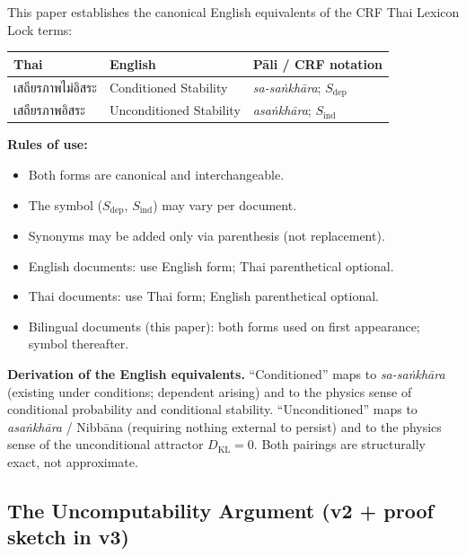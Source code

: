 \documentclass[12pt, a4paper]{article}
\begin{document}
This paper establishes the canonical English equivalents of the
CRF Thai Lexicon Lock terms:

\begin{formalbox}[title={Lexicon Lock --- Canonical Bilingual Form (v3)}]
\begin{center}
\renewcommand{\arraystretch}{1.40}
\begin{tabular}{p{3.5cm} p{3.5cm} p{4.5cm}}
\toprule
\textbf{Thai} & \textbf{English} & \textbf{Pāli / CRF notation}\\
\midrule
เสถียรภาพไม่อิสระ & Conditioned Stability & \emph{sa-saṅkhāra}; $S_{\mathrm{dep}}$\\
เสถียรภาพอิสระ & Unconditioned Stability & \emph{asaṅkhāra}; $S_{\mathrm{ind}}$\\
\bottomrule
\end{tabular}
\end{center}

\textbf{Rules of use:}
\begin{itemize}[leftmargin=*,noitemsep]
\item Both forms are canonical and interchangeable.
\item The symbol ($S_{\mathrm{dep}}$, $S_{\mathrm{ind}}$) may vary
  per document.
\item Synonyms may be added only via parenthesis (not replacement).
\item English documents: use English form; Thai parenthetical optional.
\item Thai documents: use Thai form; English parenthetical optional.
\item Bilingual documents (this paper): both forms used on first
  appearance; symbol thereafter.
\end{itemize}

\textbf{Derivation of the English equivalents.}
``Conditioned'' maps to \emph{sa-saṅkhāra} (existing under
conditions; dependent arising) and to the physics sense of
conditional probability and conditional stability. ``Unconditioned''
maps to \emph{asaṅkhāra} / Nibbāna (requiring nothing external to
persist) and to the physics sense of the unconditional attractor
$D_{\mathrm{KL}} = 0$. Both pairings are structurally exact,
not approximate.
\end{formalbox}

\subsection{The Uncomputability Argument (v2 + proof sketch in v3)}
\label{sec:uncomputability}
\end{document}
